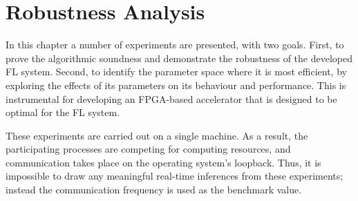 \chapter{Robustness Analysis}
\label{Chapter-Robustness-Analysis}


In this chapter a number of experiments are presented, with two goals. First, to prove the algorithmic soundness and demonstrate the robustness of the developed FL system. Second, to identify the parameter space where it is most efficient, by exploring the effects of its parameters on its behaviour and performance. This is instrumental for developing an FPGA-based accelerator that is designed to be optimal for the FL system. %

These experiments are carried out on a single machine. As a result, the participating processes are competing for computing resources, and communication takes place on the operating system's loopback. Thus, it is impossible to draw any meaningful real-time inferences from these experiments; instead the communication frequency is used as the benchmark value. %

